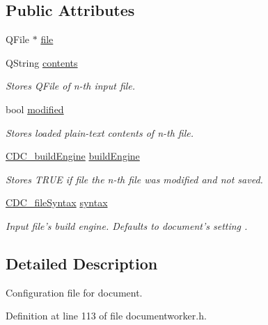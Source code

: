 \subsection*{Public Attributes}
\begin{DoxyCompactItemize}
\item 
Q\+File $\ast$ \hyperlink{structdocument_worker_1_1_c_d_c__input_file_a807c1fdfcb9e3d0d1112e7fa940505b8}{file}
\item 
Q\+String \hyperlink{structdocument_worker_1_1_c_d_c__input_file_af38edb5a0dfeda3255dd655e736001e0}{contents}
\begin{DoxyCompactList}\small\item\em Stores Q\+File of n-\/th input file. \end{DoxyCompactList}\item 
bool \hyperlink{structdocument_worker_1_1_c_d_c__input_file_a1d8506dc892dc3214443fd12e4c00a95}{modified}
\begin{DoxyCompactList}\small\item\em Stores loaded plain-\/text contents of n-\/th file. \end{DoxyCompactList}\item 
\hyperlink{cdcdefs_8h_abd38cc943467f0d66216a60454d5ee06}{C\+D\+C\+\_\+build\+Engine} \hyperlink{structdocument_worker_1_1_c_d_c__input_file_a31bc229e003dfd135332eb1d57d982f0}{build\+Engine}
\begin{DoxyCompactList}\small\item\em Stores T\+R\+U\+E if file the n-\/th file was modified and not saved. \end{DoxyCompactList}\item 
\hyperlink{cdcdefs_8h_ab649dd84a9663b16384131638df4d313}{C\+D\+C\+\_\+file\+Syntax} \hyperlink{structdocument_worker_1_1_c_d_c__input_file_a7d61569171fa87894c81e9b85575d1be}{syntax}
\begin{DoxyCompactList}\small\item\em Input file's build engine. Defaults to document's setting . \end{DoxyCompactList}\end{DoxyCompactItemize}


\subsection{Detailed Description}
Configuration file for document. 

Definition at line 113 of file documentworker.\+h.




